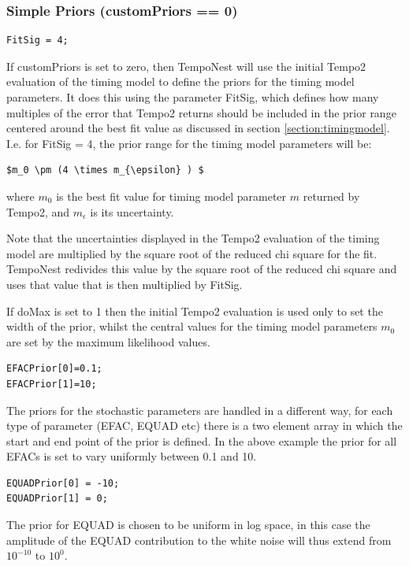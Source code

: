 \documentclass[%
 preprint,
 amsmath,amssymb,amsfonts,
 aps,
]{revtex4-1}
\begin{document}
\subsubsection{Simple Priors (customPriors == 0)}

\begin{lstlisting}
FitSig = 4;
\end{lstlisting}

If customPriors is set to zero, then TempoNest will use the initial Tempo2 evaluation of the timing model to define the priors for the timing model parameters.  It does this using the parameter FitSig, which defines how many multiples of the error that Tempo2 returns should be included in the prior range centered around the best fit value as discussed in section \ref{section:timingmodel}. I.e. for FitSig = 4, the prior range for the timing model parameters will be:

\begin{lstlisting}[mathescape]
$m_0 \pm (4 \times m_{\epsilon} ) $
\end{lstlisting}  
%
where $m_0$ is the best fit value for timing model parameter $m$ returned by Tempo2, and $m_{\epsilon}$ is its uncertainty.

Note that the uncertainties displayed in the Tempo2 evaluation of the timing model are multiplied by the square root of the reduced chi square for the fit.  TempoNest redivides this value by the square root of the reduced chi square and uses that value that is then multiplied by FitSig.

If doMax is set to 1 then the initial Tempo2 evaluation is used only to set the width of the prior, whilst the central values for the timing model parameters $m_0$ are set by the maximum likelihood values.


\begin{lstlisting}
EFACPrior[0]=0.1;
EFACPrior[1]=10;
\end{lstlisting}

The priors for the stochastic parameters are handled in a different way, for each type of parameter (EFAC, EQUAD etc) there is a two element array in which the start and end point of the prior is defined.  In the above example the prior for all EFACs is set to vary uniformly between 0.1 and 10.  
%
\begin{lstlisting}
EQUADPrior[0] = -10;
EQUADPrior[1] = 0;
\end{lstlisting}

The prior for EQUAD is chosen to be uniform in log space, in this case the amplitude of the EQUAD contribution to the white noise will thus extend from $10^{-10}$ to $10^0$. 
\end{document}

